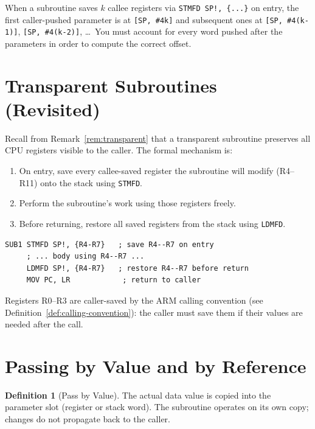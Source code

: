 \documentclass[11pt, a4paper, notitlepage]{report}
\theoremstyle{definition}
\newtheorem{definition}[theorem]{Definition}
\theoremstyle{remark}
\theoremstyle{definition}
\begin{document}
\begin{keyresult}[title={SP-Offset Arithmetic for Stack Parameters}]
When a subroutine saves $k$ callee registers via \texttt{STMFD SP!, \{...\}} on entry, the first caller-pushed parameter is at \texttt{[SP, \#4k]} and subsequent ones at \texttt{[SP, \#4(k-1)]}, \texttt{[SP, \#4(k-2)]}, \ldots\ You must account for every word pushed after the parameters in order to compute the correct offset.
\end{keyresult}

\section{Transparent Subroutines (Revisited)}

Recall from Remark~\ref{rem:transparent} that a transparent subroutine preserves all CPU registers visible to the caller. The formal mechanism is:

\begin{enumerate}
  \item On entry, save every callee-saved register the subroutine will modify (R4--R11) onto the stack using \texttt{STMFD}.
  \item Perform the subroutine's work using those registers freely.
  \item Before returning, restore all saved registers from the stack using \texttt{LDMFD}.
\end{enumerate}

\begin{lstlisting}
SUB1 STMFD SP!, {R4-R7}   ; save R4--R7 on entry
     ; ... body using R4--R7 ...
     LDMFD SP!, {R4-R7}   ; restore R4--R7 before return
     MOV PC, LR            ; return to caller
\end{lstlisting}

Registers R0--R3 are caller-saved by the ARM calling convention (see Definition~\ref{def:calling-convention}): the caller must save them if their values are needed after the call.

\section{Passing by Value and by Reference}

\begin{definition}[Pass by Value]
\label{def:pass-by-value}
The actual data value is copied into the parameter slot (register or stack word). The subroutine operates on its own copy; changes do not propagate back to the caller.
\end{definition}
\end{document}
